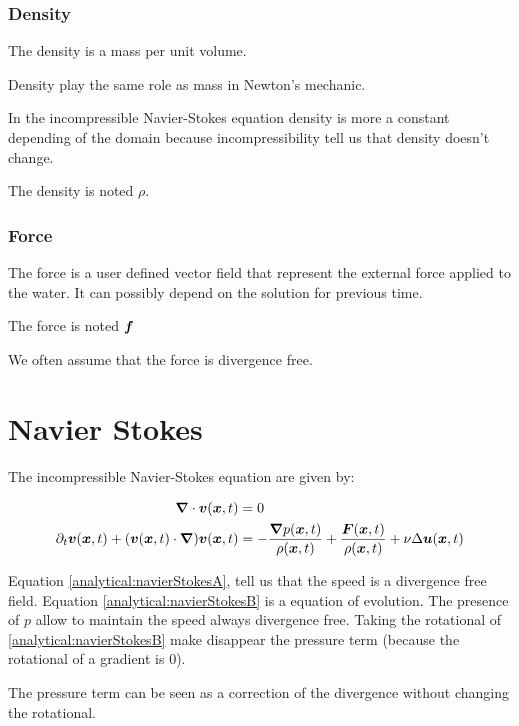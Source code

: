 \subsubsection{Density}

The density is a mass per unit volume.

Density play the same role as mass in Newton's mechanic.

In the incompressible Navier-Stokes equation density is more a constant depending
of the domain because incompressibility tell us that density doesn't change.

The density is noted $\rho$.

\subsubsection{Force}

The force is a user defined vector field that represent the external force applied to the water.
It can possibly depend on the solution for previous time.

The force is noted ${\boldsymbol {f}}$

We often assume that the force is divergence free.
\section{Navier Stokes}

The incompressible Navier-Stokes equation are given by:

\begin{align}
\label{analytical:navierStokesA}
{\boldsymbol {\nabla}} \cdot {\boldsymbol {v}}({\boldsymbol {x}} ,t)&=0\\
\label{analytical:navierStokesB}
\partial_t {\boldsymbol {v}}({\boldsymbol {x}} ,t)+({\boldsymbol {v}}({\boldsymbol {x}},t)\cdot{\boldsymbol {\nabla}} ) {\boldsymbol {v}}({\boldsymbol {x}} ,t)&=-\frac{{\boldsymbol {\nabla}} p({\boldsymbol {x}},t)}{\rho({\boldsymbol {x}},t)}+\frac{{\boldsymbol {F}}({\boldsymbol {x}},t)}{\rho({\boldsymbol {x}},t)}+\nu \Delta {\boldsymbol {u}}({\boldsymbol {x}},t)
\end{align}

Equation \ref{analytical:navierStokesA}, tell us that the speed is a divergence free field.
Equation \ref{analytical:navierStokesB} is a equation of evolution. The presence of $p$ allow to maintain the speed always divergence free.
Taking the rotational of \ref{analytical:navierStokesB} make disappear the pressure term (because the rotational of a gradient is 0).

The pressure term can be seen as a correction of the divergence without changing the rotational.

